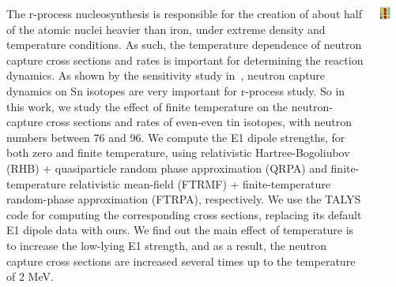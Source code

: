 \documentclass[25pt, a0paper, portrait]{tikzposter}
\begin{document}
\begin{columns}

    \block{~}
    {The r-process nucleosynthesis is responsible for the creation of about half of
    the atomic nuclei heavier than iron, under extreme density and temperature
    conditions. As such, the temperature dependence of neutron capture cross
    sections and rates is important for determining the reaction dynamics. As shown
    by the sensitivity study in~\cite{Mumpower2016}, neutron capture dynamics
    on Sn isotopes are very important for r-process study.  So in this work, we
    study the effect of finite temperature on the neutron-capture cross sections and
    rates of even-even tin isotopes, with neutron numbers between 76 and 96.  We
    compute the E1 dipole strengths, for both zero and finite temperature, using
    relativistic Hartree-Bogoliubov (RHB) + quasiparticle random phase approximation
    (QRPA) and finite-temperature relativistic mean-field (FTRMF) +
    finite-temperature random-phase approximation (FTRPA), respectively. We use the
    TALYS code for computing the corresponding cross sections, replacing its default
    E1 dipole data with ours.  We find out the main effect of temperature is to
    increase the low-lying E1 strength, and as a result, the neutron capture cross
    sections are increased several times up to the temperature of 2 MeV.}


    {
        \begin{tikzfigure}
            \includegraphics[width=0.4\textwidth]{images/colormesh.pdf}
        \end{tikzfigure}
    }




\end{columns}
\end{document}
